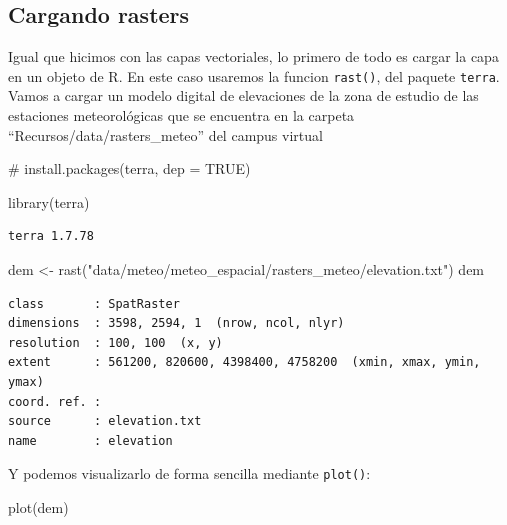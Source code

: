 \documentclass[
  letterpaper,
  DIV=11,
  numbers=noendperiod]{scrreprt}
\newenvironment{Shaded}{\begin{snugshade}}{\end{snugshade}}
\newcommand{\CommentTok}[1]{\textcolor[rgb]{0.37,0.37,0.37}{#1}}
\newcommand{\FunctionTok}[1]{\textcolor[rgb]{0.28,0.35,0.67}{#1}}
\newcommand{\NormalTok}[1]{\textcolor[rgb]{0.00,0.23,0.31}{#1}}
\newcommand{\OtherTok}[1]{\textcolor[rgb]{0.00,0.23,0.31}{#1}}
\newcommand{\StringTok}[1]{\textcolor[rgb]{0.13,0.47,0.30}{#1}}
\begin{document}
\hypertarget{cargando-rasters}{%
\subsection{Cargando rasters}\label{cargando-rasters}}

Igual que hicimos con las capas vectoriales, lo primero de todo es
cargar la capa en un objeto de R. En este caso usaremos la funcion
\texttt{rast()}, del paquete \texttt{terra}. Vamos a cargar un modelo
digital de elevaciones de la zona de estudio de las estaciones
meteorológicas que se encuentra en la carpeta
``Recursos/data/rasters\_meteo'' del campus virtual

\begin{Shaded}
\begin{Highlighting}[]
\CommentTok{\# install.packages(\textquotesingle{}terra\textquotesingle{}, dep = TRUE)}

\FunctionTok{library}\NormalTok{(terra)}
\end{Highlighting}
\end{Shaded}

\begin{verbatim}
terra 1.7.78
\end{verbatim}

\begin{Shaded}
\begin{Highlighting}[]
\NormalTok{dem }\OtherTok{\textless{}{-}} \FunctionTok{rast}\NormalTok{(}\StringTok{"data/meteo/meteo\_espacial/rasters\_meteo/elevation.txt"}\NormalTok{)}
\NormalTok{dem}
\end{Highlighting}
\end{Shaded}

\begin{verbatim}
class       : SpatRaster 
dimensions  : 3598, 2594, 1  (nrow, ncol, nlyr)
resolution  : 100, 100  (x, y)
extent      : 561200, 820600, 4398400, 4758200  (xmin, xmax, ymin, ymax)
coord. ref. :  
source      : elevation.txt 
name        : elevation 
\end{verbatim}

Y podemos visualizarlo de forma sencilla mediante \texttt{plot()}:

\begin{Shaded}
\begin{Highlighting}[]
\FunctionTok{plot}\NormalTok{(dem)}
\end{Highlighting}
\end{Shaded}
\end{document}
